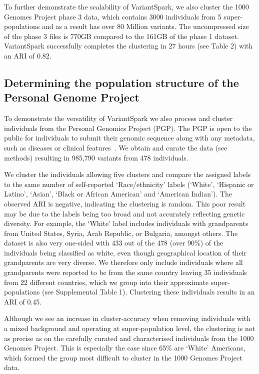 \documentclass{bmcart}
\newcommand{\variantSpark}{{\sc VariantSpark}}
\begin{document}
To further demonstrate the scalability of \variantSpark{}, we also cluster the 1000 Genomes Project phase 3 data, which contains 3000 individuals from 5 super-populations and as a result has over 80 Million variants. 
The uncompressed size of the phase 3 files is 770GB compared to the 161GB of the phase 1 dataset.
\variantSpark{} successfully completes the clustering in 27 hours (see Table 2) with an ARI of 0.82. 



\subsection*{Determining the population structure of the Personal Genome Project}
To demonstrate the versatility of \variantSpark{} we also process and cluster individuals from the Personal Genomics Project (PGP). The PGP is open to the public for individuals to submit their genomic sequence along with any metadata, such as diseases or clinical features~\cite{Lunshof2013}. 
We obtain and curate the data (see methods) resulting in 985,790 variants from 478 individuals.

We cluster the individuals allowing five clusters and compare the assigned labels to the same number of self-reported `Race/ethnicity' labels (`White', `Hispanic or Latino', `Asian', `Black or African American' and `American Indian').
The observed ARI is negative, indicating the clustering is random. 
This poor result may be due to the labels being too broad and not accurately reflecting genetic diversity. For example, the `White' label includes individuals with grandparents from United States, Syria, Arab Republic, or Bulgaria, amongst others. 
The dataset is also very one-sided with 433 out of the 478 (over 90\%) of the individuals being classified as white, even though geographical location of their grandparents are very diverse.
We therefore only include individuals where all grandparents were reported to be from the same country leaving 35 individuals from 22 different countries, which we group into their approximate super-populations (see Supplemental Table 1). 
Clustering these individuals results in an ARI of 0.45. 

Although we see an increase in cluster-accuracy when removing individuals with a mixed background and operating at super-population level, the clustering is not as precise as on the carefully curated and characterised individuals from the 1000 Genomes Project.
This is especially the case since 65\% are `White' Americans, which formed the group most difficult to cluster in the 1000 Genomes Project data.
\end{document}
